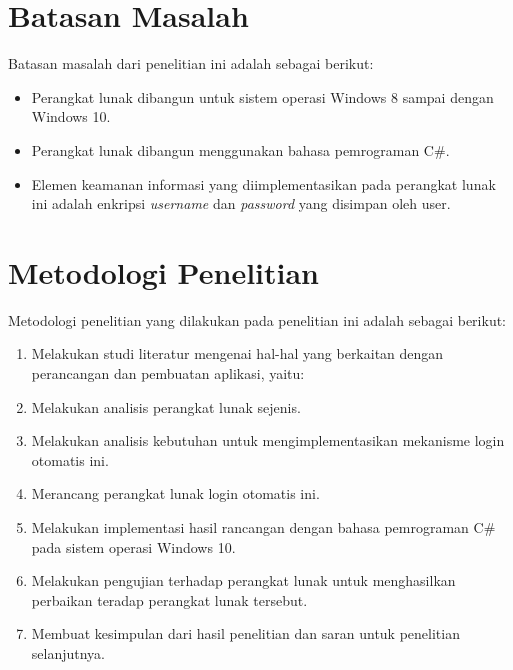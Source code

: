 \section{Batasan Masalah}
\label{sec:batasan_masalah}

Batasan masalah dari penelitian ini adalah sebagai berikut:

\begin{itemize}
	\item{Perangkat lunak dibangun untuk sistem operasi Windows 8 sampai dengan Windows 10.}
    \item{Perangkat lunak dibangun menggunakan bahasa pemrograman C\#.}
	\item{Elemen keamanan informasi yang diimplementasikan pada perangkat lunak ini adalah enkripsi \textit{username} dan \textit{password} yang disimpan oleh user.}
\end{itemize}



\section{Metodologi Penelitian}
\label{sec:metodologi_penelitian}

Metodologi penelitian yang dilakukan pada penelitian ini adalah sebagai berikut:

\begin{enumerate}
    \item{Melakukan studi literatur mengenai hal-hal yang berkaitan dengan perancangan dan pembuatan aplikasi, yaitu:}
    \item{Melakukan analisis perangkat lunak sejenis.}
    \item{Melakukan analisis kebutuhan untuk mengimplementasikan mekanisme login otomatis ini.}
    \item{Merancang perangkat lunak login otomatis ini.}
    \item{Melakukan implementasi hasil rancangan dengan bahasa pemrograman C\# pada sistem operasi Windows 10.}
    \item{Melakukan pengujian terhadap perangkat lunak untuk menghasilkan perbaikan teradap perangkat lunak tersebut.}
    \item{Membuat kesimpulan dari hasil penelitian dan saran untuk penelitian selanjutnya.}
\end{enumerate}


